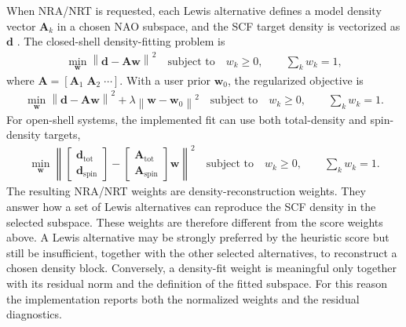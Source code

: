 \documentclass[11pt]{article}
\begin{document}
When NRA/NRT is requested, each Lewis alternative defines a model density vector $\mathbf{A}_k$ in a chosen NAO subspace, and the SCF target density is vectorized as $\mathbf{d}$ \cite{GlendeningWeinholdNRT}.  The closed-shell density-fitting problem is
\begin{align}
	\min_{\mathbf{w}}
	\left\| \mathbf{d} - \mathbf{A}\mathbf{w} \right\|^2
	\quad\text{subject to}\quad
	w_k \ge 0,\qquad \sum_k w_k = 1,
	\label{eq:nra-section2}
\end{align}
where $\mathbf{A}=[\mathbf{A}_1\;\mathbf{A}_2\;\cdots]$.  With a user prior $\mathbf{w}_0$, the regularized objective is
\begin{equation}
\begin{aligned}
	\min_{\mathbf{w}}
	\left\| \mathbf{d} - \mathbf{A}\mathbf{w} \right\|^2
	+ \lambda \left\| \mathbf{w}-\mathbf{w}_0 \right\|^2
	\quad\text{subject to}\quad
	w_k \ge 0,\qquad \sum_k w_k = 1.
\end{aligned}
\end{equation}
For open-shell systems, the implemented fit can use both total-density and spin-density targets,
\begin{equation}
\begin{aligned}
	\min_{\mathbf{w}}
	\left\|
	\begin{bmatrix}
	\mathbf{d}_{\mathrm{tot}} \\
	\mathbf{d}_{\mathrm{spin}}
	\end{bmatrix}
	-
	\begin{bmatrix}
	\mathbf{A}_{\mathrm{tot}} \\
	\mathbf{A}_{\mathrm{spin}}
	\end{bmatrix}
	\mathbf{w}
	\right\|^2
	\quad\text{subject to}\quad
	w_k \ge 0,\qquad \sum_k w_k = 1.
\end{aligned}
\end{equation}
The resulting NRA/NRT weights are density-reconstruction weights.  They answer how a set of Lewis alternatives can reproduce the SCF density in the selected subspace.  These weights are therefore different from the score weights above.  A Lewis alternative may be strongly preferred by the heuristic score but still be insufficient, together with the other selected alternatives, to reconstruct a chosen density block.  Conversely, a density-fit weight is meaningful only together with its residual norm and the definition of the fitted subspace.  For this reason the implementation reports both the normalized weights and the residual diagnostics.
\end{document}

